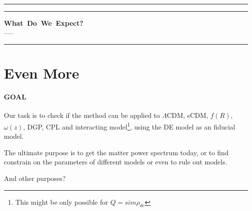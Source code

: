 \documentclass{article}
\begin{document}


\hrule\vspace{1pt}\hrule
\begin{center}
\mbox{{\bf What Do We Expect?}} \\
\vspace{0.5em}
\mbox{{-----}}
\end{center}
\hrule




\section{Even More}

\paragraph{GOAL} Our task is to check if the method can be applied to $\Lambda$CDM, sCDM, $f(R)$, $\omega(z)$, DGP, CPL and interacting model\footnote{This might be only possible for $Q=sim\rho_{de}$}, using the DE model as an fiducial model.

The ultimate purpose is to get the matter power spectrum today, or to find constrain on the parameters of different models or even to rule out models.

And other purposes?
\end{document}
